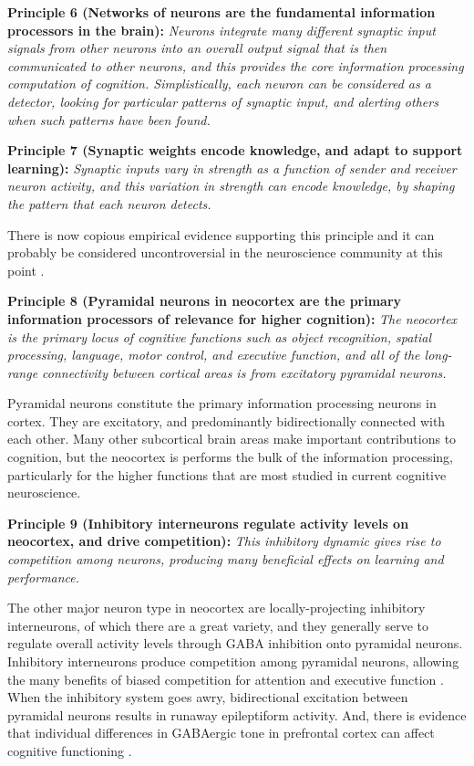 \documentclass[11pt,twoside]{article}
\begin{document}
{\bf Principle 6 (Networks of neurons are the fundamental information
  processors in the brain):} {\em Neurons integrate many different synaptic
  input signals from other neurons into an overall output signal that is then
  communicated to other neurons, and this provides the core information
  processing computation of cognition.  Simplistically, each neuron can be
  considered as a detector, looking for particular patterns of synaptic input,
  and alerting others when such patterns have been found.}

{\bf Principle 7 (Synaptic weights encode knowledge, and adapt to support
  learning):} {\em Synaptic inputs vary in strength as a function of sender
  and receiver neuron activity, and this variation in strength can encode
  knowledge, by shaping the pattern that each neuron detects.}

There is now copious empirical evidence supporting this principle and it can
probably be considered uncontroversial in the neuroscience community at this
point \cite{ltpsynapserefs}.

{\bf Principle 8 (Pyramidal neurons in neocortex are the primary information
  processors of relevance for higher cognition):} {\em The neocortex is the
  primary locus of cognitive functions such as object recognition, spatial
  processing, language, motor control, and executive function, and all of the
  long-range connectivity between cortical areas is from excitatory pyramidal
  neurons.} 

Pyramidal neurons constitute the primary information processing neurons in
cortex.  They are excitatory, and predominantly bidirectionally
connected with each other.  Many other subcortical brain areas make important
contributions to cognition, but the neocortex is performs the bulk of the
information processing, particularly for the higher functions that are most
studied in current cognitive neuroscience.

{\bf Principle 9 (Inhibitory interneurons regulate activity levels on
  neocortex, and drive competition):} {\em This
  inhibitory dynamic gives rise to competition among neurons, producing many
  beneficial effects on learning and performance.}

The other major neuron type in neocortex are locally-projecting inhibitory
interneurons, of which there are a great variety, and they generally serve to
regulate overall activity levels through GABA inhibition onto pyramidal
neurons.  Inhibitory interneurons produce competition among pyramidal neurons,
allowing the many benefits of biased competition for attention and executive
function \cite{DesimoneDuncan95,HerdBanichOReilly06}.  When the inhibitory
system goes awry, bidirectional excitation between pyramidal neurons results
in runaway epileptiform activity. And, there is evidence that individual
differences in GABAergic tone in prefrontal cortex can affect cognitive
functioning \cite{SnyderHutchisonNyhusEtAl10}.
\end{document}
